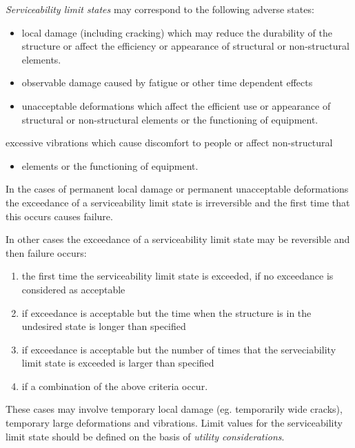 \documentclass[%
oneside,                 %
final,                   %
10pt]{article}
\begin{document}
\emph{Serviceability limit states} may correspond to the following adverse states:
\begin{itemize}
\item local damage (including cracking) which may reduce the durability of the structure or affect the efficiency or appearance of structural or non-structural elements.

\item observable damage caused by fatigue or other time dependent effects

\item unacceptable deformations which affect the efficient use or appearance of structural or non-structural elements or the functioning of equipment.
\end{itemize}

\noindent
excessive vibrations which cause discomfort to people or affect non-structural
\begin{itemize}
\item elements or the functioning of equipment.
\end{itemize}

\noindent
In the cases of permanent local damage or permanent unacceptable deformations the exceedance of a serviceability limit state is irreversible and the first time that this occurs causes failure.

In other cases the exceedance of a serviceability limit state may be reversible and then failure occurs:

\begin{enumerate}
\item the first time the serviceability limit state is exceeded, if no exceedance is considered as acceptable

\item if exceedance is acceptable but the time when the structure is in the undesired state is longer than specified

\item if exceedance is acceptable but the number of times that the serveciability limit state is exceeded is larger than specified

\item if a combination of the above criteria occur.
\end{enumerate}

\noindent
These cases may involve temporary local damage (eg. temporarily wide cracks), temporary large deformations and vibrations. Limit values for the serviceability limit state should be defined on the basis of \emph{utility considerations}.
\end{document}
